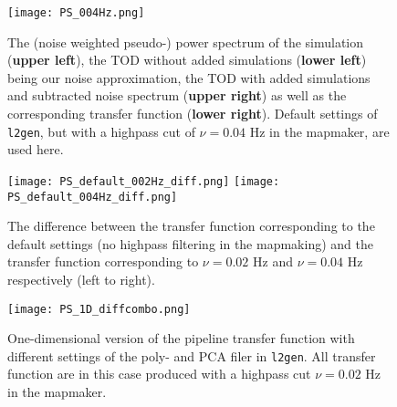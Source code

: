 \documentclass{aastex62}
\begin{document}
\begin{figure}
    \texttt{[image: PS\_004Hz.png]}
    \caption{The (noise weighted pseudo-) power spectrum of the simulation (\textbf{upper left}), the TOD without added simulations (\textbf{lower left}) being our noise approximation, the TOD with added simulations and subtracted noise spectrum (\textbf{upper right}) as well as the corresponding transfer function (\textbf{lower right}). Default settings of \texttt{l2gen}, but with a highpass cut of $\nu = 0.04$ Hz in the mapmaker, are used here.} 
    \label{fig:fig5}
\end{figure}

\begin{figure}
    \texttt{[image: PS\_default\_002Hz\_diff.png]}
    \texttt{[image: PS\_default\_004Hz\_diff.png]}
    \caption{The difference between the transfer function corresponding to the default settings (no highpass filtering in the mapmaking) and the transfer function corresponding to $\nu = 0.02$ Hz and $\nu = 0.04$ Hz respectively (left to right).} 
    \label{fig:fig6}
\end{figure}

\begin{figure}
    \texttt{[image: PS\_1D\_diffcombo.png]}
    \caption{One-dimensional version of the pipeline transfer function with different settings of the poly- and PCA filer in \texttt{l2gen}. All transfer function are in this case produced with a highpass cut $\nu = 0.02$ Hz in the mapmaker.} 
    \label{fig:fig7}
\end{figure}
\end{document}
